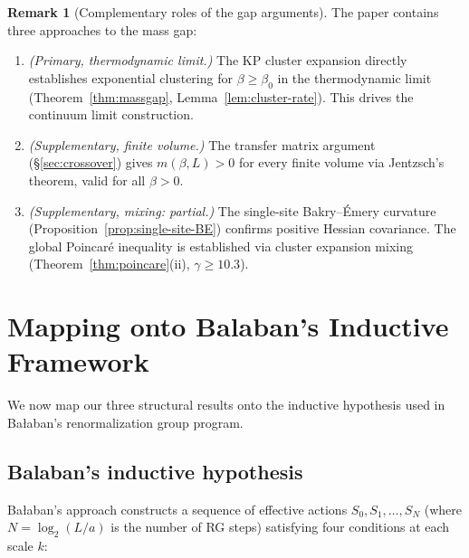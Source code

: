 \documentclass[11pt]{article}
\theoremstyle{definition}
\newtheorem{remark}[theorem]{Remark}
\begin{document}
\begin{remark}[Complementary roles of the gap arguments]
The paper contains three approaches to the mass gap:
\begin{enumerate}[nosep]
\item \emph{(Primary, thermodynamic limit.)} The KP cluster
expansion directly establishes exponential clustering for
$\beta\ge\beta_0$ in the thermodynamic limit
(Theorem~\ref{thm:massgap}, Lemma~\ref{lem:cluster-rate}).
This drives the continuum limit construction.
\item \emph{(Supplementary, finite volume.)}
The transfer matrix argument (\S\ref{sec:crossover}) gives
$m(\beta,L)>0$ for every finite volume via Jentzsch's theorem,
valid for all $\beta>0$.
\item \emph{(Supplementary, mixing: partial.)}
The single-site Bakry--\'Emery curvature
(Proposition~\ref{prop:single-site-BE}) confirms positive
Hessian covariance.  The global Poincar\'e inequality
is established via cluster expansion mixing
(Theorem~\ref{thm:poincare}(ii), $\gamma\ge 10.3$).
\end{enumerate}
\end{remark}

\section{Mapping onto Balaban's Inductive Framework}\label{sec:roadmap}

We now map our three structural results onto the inductive hypothesis
used in Ba\l aban's renormalization group program.

\subsection{Balaban's inductive hypothesis}

Ba\l aban's approach constructs a sequence of effective actions
$S_0,S_1,\ldots,S_N$ (where $N=\log_2(L/a)$ is the number of RG steps)
satisfying four conditions at each scale $k$:
\end{document}
